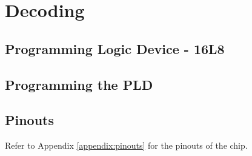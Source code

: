 \newpage
\section{Decoding}

    \subsection{Programming Logic Device - 16L8}

    \subsection{Programming the PLD}

    \subsection{Pinouts}
    Refer to Appendix \ref{appendix:pinouts} for the pinouts of the chip.

